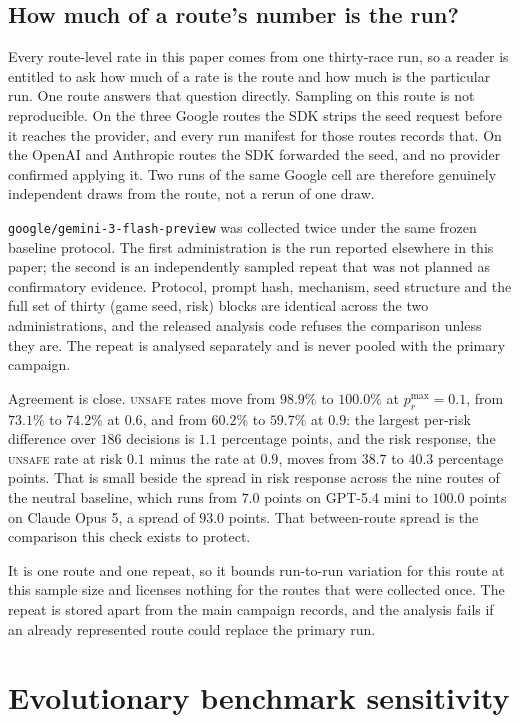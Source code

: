 \documentclass{article}
\newcommand{\Unsafe}{\textsc{unsafe}}
\begin{document}
\subsection{How much of a route's number is the run?}
\label{app:baseline-replication}

Every route-level rate in this paper comes from one thirty-race run, so a
reader is entitled to ask how much of a rate is the route and how much is the
particular run. One route answers that question directly. Sampling on this
route is not reproducible. On the three Google routes the SDK strips the seed
request before it reaches the provider, and every run manifest for those
routes records that. On the OpenAI and Anthropic routes the SDK forwarded the
seed, and no provider confirmed applying it. Two runs of the same Google cell
are therefore genuinely independent draws from the route, not a rerun of one
draw.

\texttt{google/gemini-3-flash-preview} was collected twice under the same
frozen baseline protocol. The first administration is the run reported
elsewhere in this paper; the second is an independently sampled repeat that was
not planned as confirmatory evidence. Protocol, prompt hash, mechanism, seed
structure and the full set of thirty (game seed, risk) blocks are identical
across the two administrations, and the released analysis code refuses the
comparison unless they are. The repeat is analysed separately and is never
pooled with the primary campaign.

Agreement is close. \Unsafe{} rates move from $98.9\%$ to $100.0\%$ at
$p_r^{\max}=0.1$, from $73.1\%$ to $74.2\%$ at $0.6$, and from $60.2\%$ to
$59.7\%$ at $0.9$: the largest per-risk difference over $186$ decisions is
$1.1$ percentage points, and the risk response, the \Unsafe{} rate at risk
$0.1$ minus the rate at $0.9$, moves from $38.7$ to $40.3$ percentage points.
That is small beside the spread in risk response across the nine routes of the
neutral baseline, which runs from $7.0$ points on GPT-5.4 mini to $100.0$
points on Claude Opus 5, a spread of $93.0$ points. That between-route spread
is the comparison this check exists to protect.

It is one route and one repeat, so it bounds run-to-run variation for this
route at this sample size and licenses nothing for the routes that were
collected once. The repeat is stored apart from the main campaign records, and
the analysis fails if an already represented route could replace the primary
run.

\section{Evolutionary benchmark sensitivity}
\end{document}
